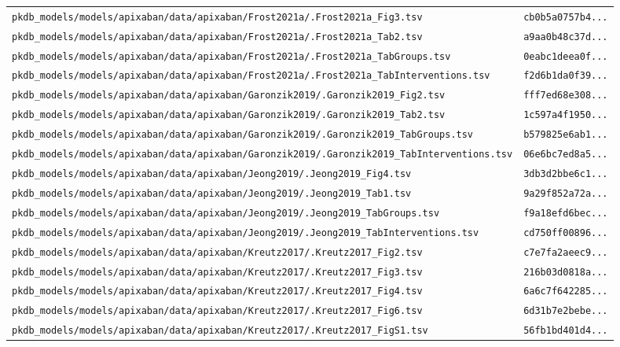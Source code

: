 \documentclass{article}
\begin{document}
\begin{longtable}{ll}
\texttt{pkdb\_models/models/apixaban/data/apixaban/Frost2021a/.Frost2021a\_Fig3.tsv} & \texttt{cb0b5a0757b4...} \\
\texttt{pkdb\_models/models/apixaban/data/apixaban/Frost2021a/.Frost2021a\_Tab2.tsv} & \texttt{a9aa0b48c37d...} \\
\texttt{pkdb\_models/models/apixaban/data/apixaban/Frost2021a/.Frost2021a\_TabGroups.tsv} & \texttt{0eabc1deea0f...} \\
\texttt{pkdb\_models/models/apixaban/data/apixaban/Frost2021a/.Frost2021a\_TabInterventions.tsv} & \texttt{f2d6b1da0f39...} \\
\texttt{pkdb\_models/models/apixaban/data/apixaban/Garonzik2019/.Garonzik2019\_Fig2.tsv} & \texttt{fff7ed68e308...} \\
\texttt{pkdb\_models/models/apixaban/data/apixaban/Garonzik2019/.Garonzik2019\_Tab2.tsv} & \texttt{1c597a4f1950...} \\
\texttt{pkdb\_models/models/apixaban/data/apixaban/Garonzik2019/.Garonzik2019\_TabGroups.tsv} & \texttt{b579825e6ab1...} \\
\texttt{pkdb\_models/models/apixaban/data/apixaban/Garonzik2019/.Garonzik2019\_TabInterventions.tsv} & \texttt{06e6bc7ed8a5...} \\
\texttt{pkdb\_models/models/apixaban/data/apixaban/Jeong2019/.Jeong2019\_Fig4.tsv} & \texttt{3db3d2bbe6c1...} \\
\texttt{pkdb\_models/models/apixaban/data/apixaban/Jeong2019/.Jeong2019\_Tab1.tsv} & \texttt{9a29f852a72a...} \\
\texttt{pkdb\_models/models/apixaban/data/apixaban/Jeong2019/.Jeong2019\_TabGroups.tsv} & \texttt{f9a18efd6bec...} \\
\texttt{pkdb\_models/models/apixaban/data/apixaban/Jeong2019/.Jeong2019\_TabInterventions.tsv} & \texttt{cd750ff00896...} \\
\texttt{pkdb\_models/models/apixaban/data/apixaban/Kreutz2017/.Kreutz2017\_Fig2.tsv} & \texttt{c7e7fa2aeec9...} \\
\texttt{pkdb\_models/models/apixaban/data/apixaban/Kreutz2017/.Kreutz2017\_Fig3.tsv} & \texttt{216b03d0818a...} \\
\texttt{pkdb\_models/models/apixaban/data/apixaban/Kreutz2017/.Kreutz2017\_Fig4.tsv} & \texttt{6a6c7f642285...} \\
\texttt{pkdb\_models/models/apixaban/data/apixaban/Kreutz2017/.Kreutz2017\_Fig6.tsv} & \texttt{6d31b7e2bebe...} \\
\texttt{pkdb\_models/models/apixaban/data/apixaban/Kreutz2017/.Kreutz2017\_FigS1.tsv} & \texttt{56fb1bd401d4...} \\

\end{longtable}
\end{document}
